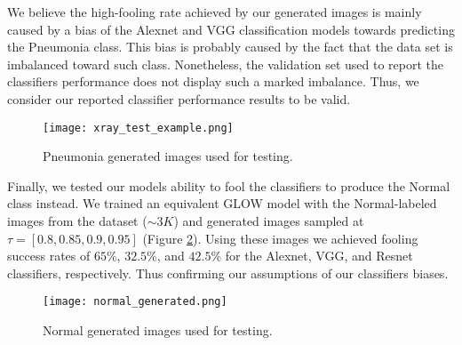 We believe the high-fooling rate achieved by our generated images is mainly caused by a bias of the Alexnet and VGG classification models towards predicting the Pneumonia class. This bias is probably caused by the fact that the data set is imbalanced toward such class. Nonetheless, the validation set used to report the classifiers performance does not display such a marked imbalance. Thus, we consider our reported classifier performance results to be valid.  

    \begin{figure}[!htbp]
        \centering
        \texttt{[image: xray\_test\_example.png]}
        \caption{Pneumonia generated images used for testing.}
        \label{fig:pneumonia_test_samples}
    \end{figure}

Finally, we tested our models ability to fool the classifiers to produce the Normal class instead. We trained an equivalent GLOW model with the Normal-labeled images from the dataset ($\sim 3K$) and generated images sampled at $\tau = [0.8, 0.85, 0.9, 0.95]$ (Figure \ref{fig:normal_test_samples}). Using these images we achieved fooling success rates of $65\%$, $32.5\%$, and $42.5\%$ for the Alexnet, VGG, and Resnet classifiers, respectively. Thus confirming our assumptions of our classifiers biases.

    \begin{figure}[!htbp]
        \centering
        \texttt{[image: normal\_generated.png]}
        \caption{Normal generated images used for testing.}
        \label{fig:normal_test_samples}
    \end{figure}

